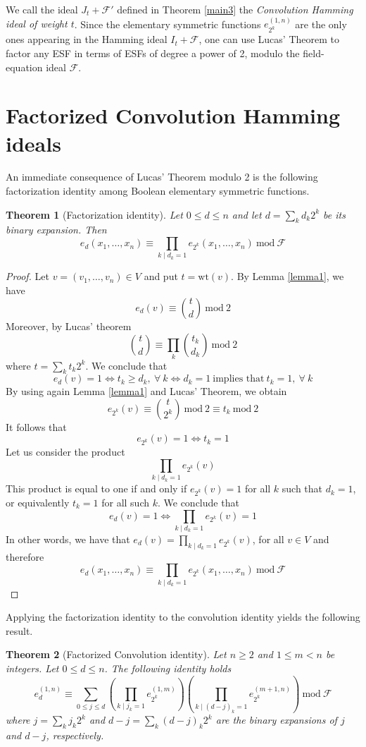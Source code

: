 \documentclass{amsart}
\newtheorem{theorem}{Theorem}[section]
\def\wt{{\mathrm{wt}}}
\def\mod{{\mathrm{mod}}}
\def\cF{{\mathcal{F}}}
\begin{document}
We call the ideal $J_t + \cF'$ defined in Theorem \ref{main3} the {\em Convolution Hamming ideal
of weight $t$}. Since the elementary symmetric functions $e_{2^k}^{(1,n)}$ are the only
ones appearing in the Hamming ideal $I_t + \cF$, one can use Lucas' Theorem to factor
any ESF in terms of ESFs of degree a power of 2, modulo the field-equation ideal $\cF$.


\section{Factorized Convolution Hamming ideals}

An immediate consequence of Lucas' Theorem modulo 2 is the following factorization identity
among Boolean elementary symmetric functions.

\begin{theorem}[Factorization identity]
Let $0\leq d\leq n$ and let $d = \sum_k d_k 2^k$ be its binary expansion. Then
\[
e_d(x_1,\ldots,x_n)\equiv \prod_{k\mid d_k = 1} e_{2^k}(x_1,\ldots,x_n)\ \mod\ \cF
\]
\end{theorem}

\begin{proof}
Let $v = (v_1,\ldots,v_n)\in V$ and put $t = \wt(v)$. By Lemma \ref{lemma1}, we have
\[
e_d(v)\equiv \binom{t}{d}\ \mod\ 2
\]
Moreover, by Lucas' theorem
\[
\binom{t}{d} \equiv \prod_k \binom{t_k}{d_k}\ \mod\ 2
\]
where $t = \sum_k t_k 2^k$. We conclude that
\[
e_d(v) = 1 \iff t_k\geq d_k,\ \forall\ k \iff d_k = 1\ \text{implies that}\ t_k = 1,\ \forall\ k
\]
By using again Lemma \ref{lemma1} and Lucas' Theorem, we obtain
\[
e_{2^k}(v) \equiv \binom{t}{2^k}\ \mod\ 2\equiv t_k\ \mod\ 2
\]
It follows that
\[
e_{2^k}(v) = 1 \iff t_k = 1
\]
Let us consider the product
\[
\prod_{k\mid d_k = 1} e_{2^k}(v)
\]
This product is equal to one if and only if $e_{2^k}(v) = 1$ for all $k$ such that $d_k = 1$,
or equivalently $t_k = 1$ for all such $k$. We conclude that
\[
e_d(v) = 1 \iff \prod_{k\mid d_k = 1} e_{2^k}(v) = 1
\]
In other words, we have that $e_d(v) = \prod_{k\mid d_k = 1} e_{2^k}(v)$, for all $v\in V$ and
therefore
\[
e_d(x_1,\ldots,x_n)\equiv \prod_{k\mid d_k = 1} e_{2^k}(x_1,\ldots,x_n)\ \mod\ \cF
\]
\end{proof}

Applying the factorization identity to the convolution identity yields the following result.

\begin{theorem}[Factorized Convolution identity]
Let $n\geq 2$ and $1\leq m < n$ be integers. Let $0\leq d\leq n$. The following identity holds
\[
e_d^{(1,n)} \equiv
\sum_{0\leq j\leq d}
( \prod_{k\mid j_k = 1} e_{2^k}^{(1,m)} )
( \prod_{k\mid (d - j)_k = 1} e_{2^k}^{(m+1,n)} )
\ \mod\ \cF
\]
where $j = \sum_k j_k 2^k$ and $d - j = \sum_k (d - j)_k 2^k$ are the binary expansions
of $j$ and $d-j$, respectively.
\end{theorem}
\end{document}

